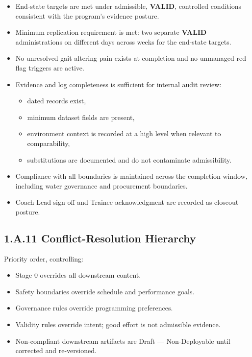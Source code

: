 \documentclass[10pt]{article}
\begin{document}
\begin{itemize}
\item End-state targets are met under admissible, \textbf{VALID}, controlled conditions consistent with the program’s evidence posture.
\item Minimum replication requirement is met: two separate \textbf{VALID} administrations on different days across weeks for the end-state targets.
\item No unresolved gait-altering pain exists at completion and no unmanaged red-flag triggers are active.
\item Evidence and log completeness is sufficient for internal audit review:

\begin{itemize}
\item dated records exist,
\item minimum dataset fields are present,
\item environment context is recorded at a high level when relevant to comparability,
\item substitutions are documented and do not contaminate admissibility.
\end{itemize}

\item Compliance with all boundaries is maintained across the completion window, including water governance and procurement boundaries.
\item Coach Lead sign-off and Trainee acknowledgment are recorded as closeout posture.
\end{itemize}

\subsection*{1.A.11 Conflict-Resolution Hierarchy}
{}

Priority order, controlling:

\begin{itemize}
\item Stage 0 overrides all downstream content.
\item Safety boundaries override schedule and performance goals.
\item Governance rules override programming preferences.
\item Validity rules override intent; good effort is not admissible evidence.
\item Non-compliant downstream artifacts are Draft — Non-Deployable until corrected and re-versioned.
\end{itemize}
\end{document}
